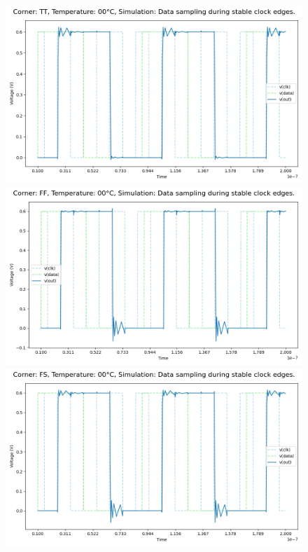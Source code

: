\begin{figure}[H]
    \centering
    \includegraphics[height= 0.21\textheight]{figures/aimspice/0.600_0.1u_0.1u_0.3u_0.1u/functionality/TT00W2.png}
    \vspace{5pt}
    \includegraphics[height= 0.21\textheight]{figures/aimspice/0.600_0.1u_0.1u_0.3u_0.1u/functionality/FF00W2.png}
    \vspace{5pt}
    \includegraphics[height= 0.21\textheight]{figures/aimspice/0.600_0.1u_0.1u_0.3u_0.1u/functionality/FS00W2.png}

\end{figure}
